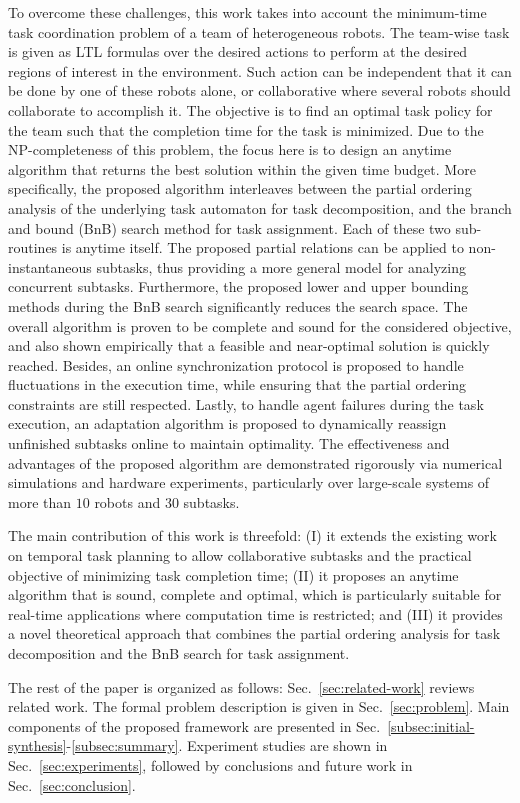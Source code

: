 To overcome these challenges,
this work takes into account the minimum-time task coordination problem of a team of heterogeneous robots.
The team-wise task is given as LTL formulas over the desired actions to perform at the
desired regions of interest in the environment.
Such action can be independent that it can be done by one of these robots alone,
or collaborative where several robots should collaborate to accomplish it.
The objective is to find an optimal task policy for the team such that the completion time for the task is minimized.
Due to the NP-completeness of this problem,
the focus here is to design an anytime algorithm that returns the best solution within the given time budget.
More specifically,
the proposed algorithm interleaves between the partial ordering analysis
of the underlying task automaton for task decomposition,
and the branch and bound (BnB) search method for task assignment.
Each of these two sub-routines is anytime itself.
The proposed partial relations can be applied to non-instantaneous subtasks,
thus providing a more general model for analyzing concurrent subtasks.
Furthermore, the proposed lower and upper bounding methods during the BnB search
significantly reduces the search space.
The overall algorithm is proven to be complete and sound for the considered objective,
and also shown empirically that a feasible and near-optimal solution is quickly reached.
Besides,
an online synchronization protocol is proposed to handle fluctuations in the execution time,
while ensuring that the partial ordering constraints are still respected.
Lastly, to handle agent failures during the task execution,
an adaptation algorithm is proposed to dynamically reassign unfinished subtasks
online to maintain optimality.
The effectiveness and advantages of the proposed algorithm
are demonstrated rigorously via numerical simulations and hardware experiments,
particularly over {large-scale} systems of more than $10$ robots and $30$ subtasks.


The main contribution of this work is threefold:
(I) it extends the existing work on temporal task planning to allow collaborative subtasks
and the practical objective of minimizing task completion time;
(II) it proposes an anytime algorithm that is sound, complete and optimal,
which is particularly suitable for real-time applications where computation time is restricted;
and (III) it provides a novel theoretical approach that combines the partial ordering
analysis for task decomposition and the BnB search for task assignment.

The rest of the paper is organized as follows:
Sec.~\ref{sec:related-work} reviews related work.
The formal problem description is given in Sec.~\ref{sec:problem}.
Main components of the proposed framework are presented in
Sec.~\ref{subsec:initial-synthesis}-\ref{subsec:summary}.
Experiment studies are shown in Sec.~\ref{sec:experiments},
followed by conclusions and future work in Sec.~\ref{sec:conclusion}.
